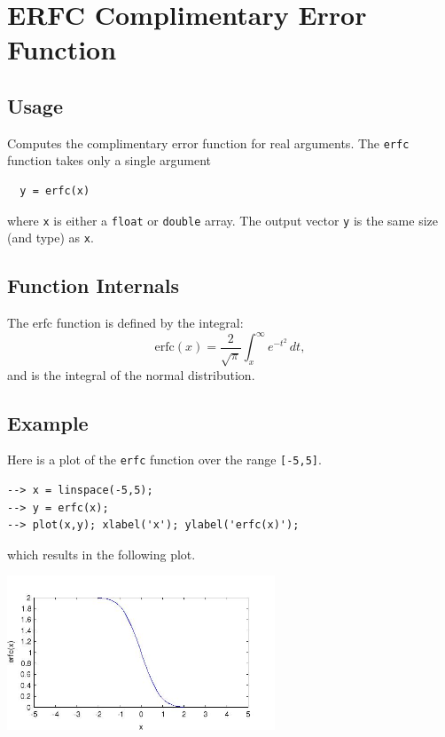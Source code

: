\section{ERFC Complimentary Error Function}

\subsection{Usage}

Computes the complimentary error function for real arguments.  The \verb|erfc|
function takes only a single argument
\begin{verbatim}
  y = erfc(x)
\end{verbatim}
where \verb|x| is either a \verb|float| or \verb|double| array.  The output
vector \verb|y| is the same size (and type) as \verb|x|.
\subsection{Function Internals}

The erfc function is defined by the integral:
\[
  \mathrm{erfc}(x) = \frac{2}{\sqrt{\pi}}\int_{x}^{\infty} e^{-t^2} \, dt,
\]
and is the integral of the normal distribution.
\subsection{Example}

Here is a plot of the \verb|erfc| function over the range \verb|[-5,5]|.
\begin{verbatim}
--> x = linspace(-5,5);
--> y = erfc(x);
--> plot(x,y); xlabel('x'); ylabel('erfc(x)');
\end{verbatim}
which results in the following plot.


\centerline{\includegraphics[width=8cm]{erfc1}}

